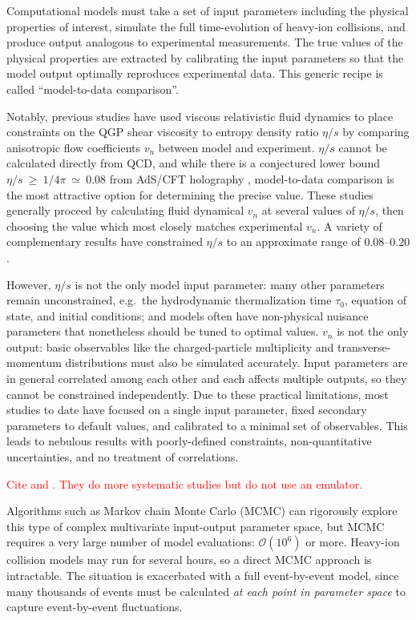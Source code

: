 \documentclass[aps,prc,reprint,superscriptaddress,amsmath]{revtex4-1}
\newcommand{\todo}[1]{\textcolor{red}{#1}}
\begin{document}
Computational models must take a set of input parameters including the physical properties of interest, simulate the full time-evolution of heavy-ion collisions, and produce output analogous to experimental measurements.
The true values of the physical properties are extracted by calibrating the input parameters so that the model output optimally reproduces experimental data.
This generic recipe is called ``model-to-data comparison''.

Notably, previous studies have used viscous relativistic fluid dynamics to place constraints on the QGP shear viscosity to entropy density ratio $\eta/s$ by comparing anisotropic flow coefficients $v_n$ between model and experiment.
$\eta/s$ cannot be calculated directly from QCD, and while there is a conjectured lower bound $\eta/s~\geq~1/4\pi~\simeq~0.08$ from AdS/CFT holography \cite{Kovtun:2004de}, model-to-data comparison is the most attractive option for determining the precise value.
These studies generally proceed by calculating fluid dynamical $v_n$ at several values of $\eta/s$, then choosing the value which most closely matches experimental $v_n$.
A variety of complementary results have constrained $\eta/s$ to an approximate range of 0.08--0.20 \cite{Luzum:2008cw,Song:2010mg,Schenke:2010rr}.

However, $\eta/s$ is not the only model input parameter:
many other parameters remain unconstrained, e.g.~the hydrodynamic thermalization time $\tau_0$, equation of state, and initial conditions; and models often have non-physical nuisance parameters that nonetheless should be tuned to optimal values.
$v_n$ is not the only output:
basic observables like the charged-particle multiplicity and transverse-momentum distributions must also be simulated accurately.
Input parameters are in general correlated among each other and each affects multiple outputs, so they cannot be constrained independently.
Due to these practical limitations, most studies to date have focused on a single input parameter, fixed secondary parameters to default values, and calibrated to a minimal set of observables.
This leads to nebulous results with poorly-defined constraints, non-quantitative uncertainties, and no treatment of correlations.

\todo{
  Cite \cite{Luzum:2012wu} and \cite{Soltz:2012rk}.
  They do more systematic studies but do not use an emulator.
}

Algorithms such as Markov chain Monte Carlo (MCMC) can rigorously explore this type of complex multivariate input-output parameter space, but MCMC requires a very large number of model evaluations: $\mathcal O(10^6)$ or more.
Heavy-ion collision models may run for several hours, so a direct MCMC approach is intractable.
The situation is exacerbated with a full event-by-event model, since many thousands of events must be calculated \emph{at each point in parameter space} to capture event-by-event fluctuations.
\end{document}
